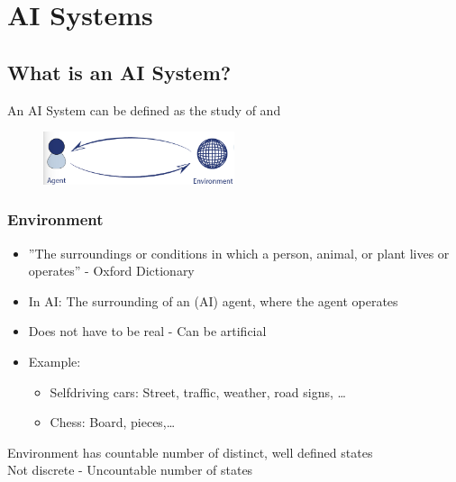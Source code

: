 \documentclass[
../../EiKI_Summary.tex,
]
{subfiles}
\begin{document}
\section{AI Systems}
\subsection{What is an AI System?}

\begin{defbox*}
    An AI System can be defined as the study of  and 
\end{defbox*}

\begin{figure}
    [htp]
    \centering
    \includegraphics[width=0.5\textwidth]{Pics/Agent_Environment.png}
\end{figure}

\subsubsection{Environment}
\begin{itemize}
    \item ''The surroundings or conditions in which a person, animal, or plant lives or operates'' - Oxford Dictionary
    \item In AI: The surrounding of an (AI) agent, where the agent operates
    \item Does not have to be real - Can be artificial
    \item Example: 
    \begin{itemize}
        \item Selfdriving cars: Street, traffic, weather, road signs, \dots
        \item Chess: Board, pieces,\dots
    \end{itemize}
\end{itemize}


\begin{defbox}
     Environment has countable number of distinct, well defined states\\
     Not discrete - Uncountable number of states
\end{defbox}
\end{document}
